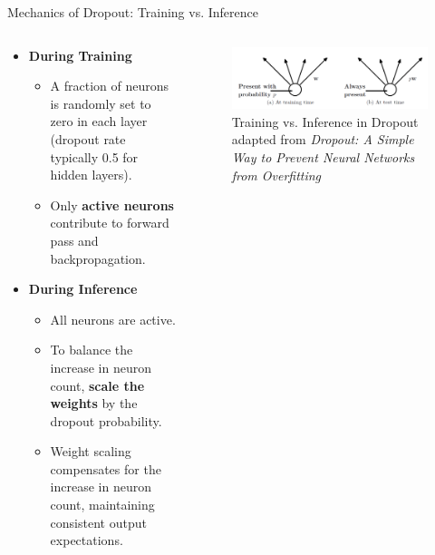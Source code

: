 \documentclass[serif, aspectratio=169]{beamer}
\begin{document}
\begin{frame}{Mechanics of Dropout: Training vs. Inference}
    \begin{columns}
        \begin{column}{0.5\textwidth}
            \begin{itemize}
                \item \textbf{During Training}
                \begin{itemize}
                    \item A fraction of neurons is randomly set to zero in each layer (dropout rate typically 0.5 for hidden layers).
                    \item Only \textbf{active neurons} contribute to forward pass and backpropagation.
                \end{itemize}
                \item \textbf{During Inference}
                \begin{itemize}
                    \item All neurons are active.
                    \item To balance the increase in neuron count, \textbf{scale the weights} by the dropout probability.
                    \item Weight scaling compensates for the increase in neuron count, maintaining consistent output expectations.
                \end{itemize}
            \end{itemize}
        \end{column}
        
        \begin{column}{0.5\textwidth}
            \begin{figure}
                \includegraphics[width=\textwidth]{pic/dropout/test-train.png}
                \caption{Training vs. Inference in Dropout adapted from \textit{Dropout: A Simple Way to Prevent Neural Networks from Overfitting}}
                \label{fig:Dropout}
            \end{figure}
        \end{column}
    \end{columns}
\end{frame}
\end{document}
